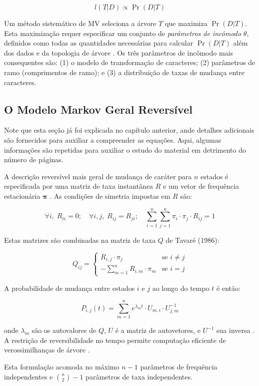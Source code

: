 $$l(T|D) \propto \Pr(D|T)$$

Um método sistemático de MV seleciona a árvore $T$ que maximiza $\Pr(D|T)$. Esta maximização requer especificar um conjunto de \textit{parâmetros de incômodo} $\theta$, definidos como todas as quantidades necessárias para calcular $\Pr(D|T)$ além dos dados e da topologia de árvore \parencite{wheeler2012}. Os três parâmetros de incômodo mais consequentes são: (1) o modelo de transformação de caracteres; (2) parâmetros de ramo (comprimentos de ramo); e (3) a distribuição de taxas de mudança entre caracteres.

\subsection{O Modelo Markov Geral Reversível}

Note que esta seção já foi explicada no capítulo anterior, ande detalhes adicionais são fornecidos para auxiliar a compreender as equações. Aqui, algumas informações são repetidas para auxiliar o estudo do material em detrimento do número de páginas.

A descrição reversível mais geral de mudança de caráter para $n$ estados é especificada por uma matriz de taxa instantânea $R$ e um vetor de frequência estacionária $\symbf{\pi}$ \parencite{yang1994,tavare1986}. As condições de simetria impostas em $R$ são:

$$\forall i,\; R_{ii} = 0; \quad \forall i,j,\; R_{ij} = R_{ji}; \quad \sum_{i=1}^{n}\sum_{j=1}^{n} \pi_i \cdot \pi_j \cdot R_{ij} = 1$$

Estas matrizes são combinadas na matriz de taxa $Q$ de Tavaré (1986):

$$Q_{ij} = \begin{cases} R_{i,j} \cdot \pi_j & \text{se } i \neq j \\ -\sum_{m=1}^{n} R_{i,m} \cdot \pi_m & \text{se } i = j \end{cases}$$

A probabilidade de mudança entre estados $i$ e $j$ ao longo do tempo $t$ é então:

$$P_{i,j}(t) = \sum_{m=1}^{n} e^{\lambda_m t} \cdot U_{m,i} \cdot U^{-1}_{j,m}$$

onde $\lambda_m$ são os autovalores de $Q$, $U$ é a matriz de autovetores, e $U^{-1}$ sua inversa \parencite{strang2006}. A restrição de reversibilidade no tempo permite computação eficiente de verossimilhanças de árvore \parencite{wheeler2012}.

Esta formulação acomoda no máximo $n-1$ parâmetros de frequência independentes e $\binom{n}{2} - 1$ parâmetros de taxa independentes.

